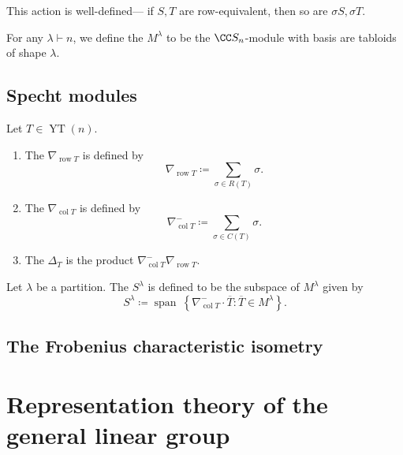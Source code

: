 \documentclass{article}
\DeclareMathOperator{\row}{row}
\DeclareMathOperator{\col}{col}
\DeclareMathOperator{\YT}{YT}
\begin{document}
This action is well-defined--- if $S,T$ are row-equivalent, then so are $\sigma S, \sigma T$.

\begin{definition}
    For any $\lambda \vdash n$, we define the  $M^\lambda$ to be the $\CC S_n$-module with basis are tabloids of shape $\lambda$.
\end{definition}

\subsection{Specht modules}

\begin{definition}
    Let $T \in \YT(n)$.
    \begin{enumerate}[label=(\alph*)]
        \item 
            The  $\nabla_{\row T}$ is defined by
            \[
                \nabla_{\row T}
                \coloneq
                \sum_{\sigma \in R(T)}
                \sigma.
            \]
        \item 
            The  $\nabla_{\col T}$ is defined by
            \[
                \nabla_{\col T}^-
                \coloneq
                \sum_{\sigma \in C(T)}
                \sigma.
            \]
        \item 
            The  $\Delta_T$ is the product $\nabla_{\col T}^- \nabla_{\row T}$.
    \end{enumerate}
\end{definition}

\begin{definition}
    Let $\lambda$ be a partition.
    The  $S^\lambda$ is defined to be the subspace of $M^\lambda$ given by
    \[
        S^\lambda
        \coloneq
        \operatorname{span}\
        \left\{
            \nabla_{\col T}^- \cdot \overline{T} :
            \overline{T} \in M^\lambda
        \right\}.
    \]
\end{definition}

\subsection{The Frobenius characteristic isometry}

\section{Representation theory of the general linear group}
\end{document}
